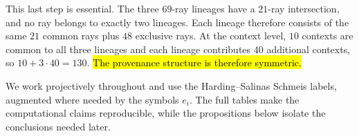 \documentclass[%
  reprint,
  superscriptaddress,
  showpacs,
  showkeys,
  amsmath,amssymb,
  pra,
  longbibliography,
  floatfix,
  x11names
]{revtex4-2}
\newenvironment{revision}{\begingroup}{\endgroup}
\newcommand{\corr}[1]{{\color{red}\hl{#1}}}
\begin{document}
\begin{revision}
This last step is essential.  The three $69$-ray lineages have a $21$-ray intersection, and no ray belongs to exactly two lineages.  Each lineage therefore consists of the same $21$ common rays plus $48$ exclusive rays.  At the context level, $10$ contexts are common to all three lineages and each lineage contributes $40$ additional contexts, so $10+3\cdot40=130$.  \corr{The provenance structure is therefore symmetric.}

We work projectively throughout and use the Harding--Salinas Schmeis labels, augmented where needed by the symbols $e_i$.  The full tables make the computational claims reproducible, while the propositions below isolate the conclusions needed later.
\end{revision}



\begin{figure}[ht]
\centering
{}
\end{figure}
\end{document}
